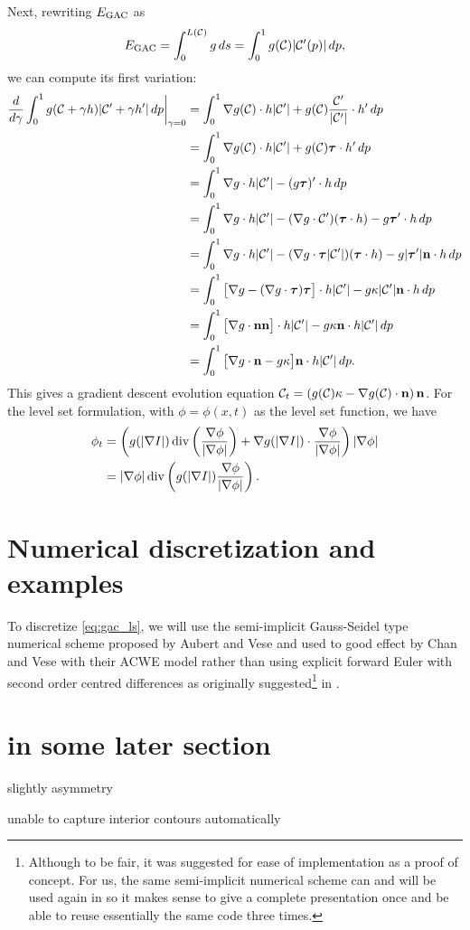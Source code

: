 Next, rewriting $E_\textrm{GAC}$ as 
\begin{align*}
E_\textrm{GAC} = \int^{L(\mathcal{C})}_0 g \, ds 
= \int^1_0 g(\mathcal{C}) \lvert\mathcal{C}'(p)\rvert \, dp ,
\end{align*} 
we can compute its first variation: 
\begin{align*}
\frac{d}{d\gamma} \int^1_0 g(\mathcal{C} + \gamma h) \lvert\mathcal{C}' + \gamma h'\rvert \, dp \bigg\rvert_{\gamma = 0}
&=  \int^1_0 \nabla g(\mathcal{C}) \cdot h \lvert\mathcal{C}'\rvert + g(\mathcal{C}) \frac{\mathcal{C}'}{\lvert\mathcal{C}'\rvert} \cdot h' \,dp 
\\
&=\int^1_0 \nabla g(\mathcal{C}) \cdot h \lvert\mathcal{C}'\rvert + g(\mathcal{C}) \boldsymbol{\tau} \cdot h' \,dp 
\\
&=\int^1_0 \nabla g \cdot h \lvert\mathcal{C}'\rvert - ( g \boldsymbol{\tau})' \cdot h \, dp
\\
&=\int^1_0 \nabla g \cdot h \lvert\mathcal{C}'\rvert - (\nabla g \cdot \mathcal{C}')(\boldsymbol{\tau} \cdot h) - g\boldsymbol{\tau} ' \cdot h \, dp
\\
&=\int^1_0 \nabla g \cdot h \lvert\mathcal{C}'\rvert - (\nabla g \cdot \boldsymbol{\tau} \lvert\mathcal{C}'\rvert )(\boldsymbol{\tau} \cdot h) - g\lvert\boldsymbol{\tau}'\rvert \mathbf{n} \cdot h \, dp
\\
&=\int^1_0 \big[ \nabla g  - (\nabla g \cdot \boldsymbol{\tau} )\boldsymbol{\tau} \big] \cdot h \lvert\mathcal{C}'\rvert - g\kappa \lvert\mathcal{C}'\rvert \mathbf{n} \cdot h \, dp
\\
&=\int^1_0 \big[\nabla g \cdot \mathbf{n} \mathbf{n} \big] \cdot h \lvert\mathcal{C}'\rvert - g\kappa  \mathbf{n} \cdot h \lvert\mathcal{C}'\rvert \, dp
\\
&=\int^1_0 \big[ \nabla g \cdot \mathbf{n} - g\kappa \big] \mathbf{n}  \cdot h \lvert\mathcal{C}'\rvert \, dp.
\\ 
\end{align*}
This gives a gradient descent evolution equation $\mathcal{C}_t = \left( g(\mathcal{C}) \kappa - \nabla g(\mathcal{C}) \cdot \mathbf{n} \right) \mathbf{n} $.
For the level set formulation, with $\phi = \phi(x, t)$ as the level set function, we have 
\begin{align}
\begin{split} 
\phi_t 
&= \left(
g( \lvert\nabla I \rvert ) \operatorname{div}\left( \frac{\nabla \phi}{\lvert\nabla \phi\rvert} \right)
	+  \nabla g(  \lvert\nabla I \rvert )\cdot  \frac{\nabla \phi}{\lvert\nabla \phi\rvert}
\right) \lvert \nabla \phi \rvert
\\
&= \lvert\nabla \phi\rvert \operatorname{div}\left( 
g(  \lvert\nabla I \rvert ) \frac{\nabla \phi}{\lvert\nabla \phi\rvert}
\right) .
\end{split}
\label{eq:gac_ls}
\end{align}

\section{Numerical discretization and examples}
To discretize \eqref{eq:gac_ls}, we will use the semi-implicit Gauss-Seidel type numerical scheme proposed by Aubert and Vese \cite{aubert1997variational} and used to good effect by Chan and Vese with their ACWE model \cite{chan2001active} rather than using explicit forward Euler with second order centred differences as originally suggested\footnote{Although to be fair, it was suggested for ease of implementation as a proof of concept. For us, the same semi-implicit numerical scheme can and will be used again in  so it makes sense to give a complete presentation once and be able to reuse essentially the same code three times. } in \cite{caselles1997geodesic}.

\section{in some later section} 

slightly asymmetry

unable to capture interior contours automatically